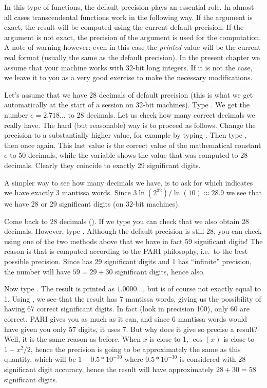 In this type of functions, the default precision plays an essential role.
In almost all cases transcendental functions work in the following way.
If the argument is exact, the result will be computed using the current
default precision. If the argument is not exact, the precision of the
argument is used for the computation. A note of warning however: even in this
case the \emph{printed} value will be the current real format (usually the
same as the default precision). In the present chapter we assume that your
machine works with 32-bit long integers. If it is not the case, we leave it
to you as a very good exercise to make the necessary modifications.

Let's assume that we have 28 decimals of default precision (this is what we
get automatically at the start of a  session on 32-bit machines). Type
. We get the number $e=2.718\dots$ to 28 decimals. Let us check
how many correct decimals we really have. The hard (but reasonable) way is to
proceed as follows. Change the precision to a substantially higher value, for
example by typing . Then type , then  once
again. This last value is the correct value of the mathematical constant $e$ to
50 decimals, while the variable  shows the value that was computed to 28
decimals. Clearly they coincide to exactly 29 significant digits.

A simpler way to see how many decimals we have, is to ask for 
which indicates we have exactly $3$ mantissa words. Since
$3\ln(2^{32}) / \ln(10)\approx28.9$ we see that we have 28 or 29 significant
digits (on 32-bit machines).

\smallskip
Come back to 28 decimals (). If we type 
you can check that we also obtain 28 decimals. However, type
. Although the default precision is still 28,
you can check using one of the two methods above that we have in fact 59
significant digits! The reason is that  is computed
according to the PARI philosophy, i.e.~to the best possible precision. Since
 has 29 significant digits and 1 has ``infinite'' precision, the
number  will have $59=29+30$ significant digits,
hence  also.

Now type . The result is printed as $1.0000\dots$, but
is of course not exactly equal to 1. Using , we see that the
result has 7 mantissa words, giving us the possibility of having 67
correct significant digits. In fact (look in precision 100), only 60 are
correct. PARI gives you as much as it can, and since 6 mantissa words
would have given you only 57 digits, it uses 7. But why does it give so
precise a result? Well, it is the same reason as before. When $x$ is close
to 1, $\cos(x)$ is close to $1-x^2/2$, hence the precision is going to be
approximately the same as this quantity, which will be $1-0.5*10^{-30}$ where
$0.5*10^{-30}$ is considered with 28 significant digit accuracy, hence the
result will have approximately $28+30=58$ significant digits.


